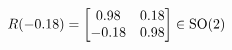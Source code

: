 \documentclass[preview]{standalone}
\begin{document}
\begin{align*}
\special{dvisvgm:raw <g id='unique000'>}R(-0.18) = \begin{bmatrix} 0.98 & 0.18 \\ -0.18 & 0.98 \end{bmatrix} \in \text{SO}(2)\special{dvisvgm:raw </g>}
\end{align*}
\end{document}
